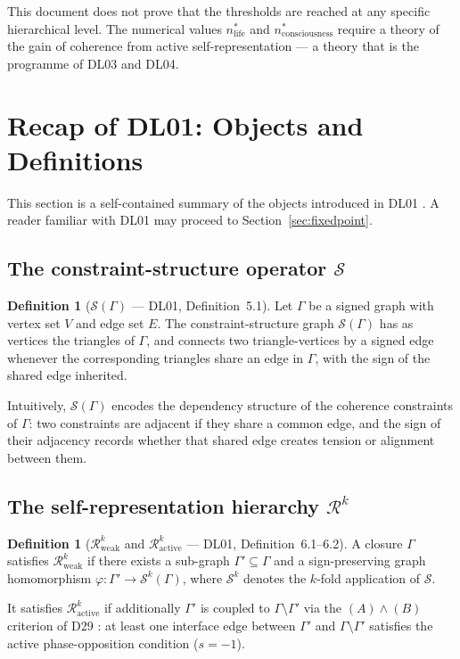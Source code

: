\documentclass[12pt,a4paper]{article}
\theoremstyle{plain}
\theoremstyle{definition}
\newtheorem{definition}[theorem]{Definition}
\theoremstyle{remark}
\newcommand{\Sop}{\mathcal{S}}
\newcommand{\Rop}{\mathcal{R}}
\newcommand{\nlife}{n^{*}_{\mathrm{life}}}
\newcommand{\ncons}{n^{*}_{\mathrm{consciousness}}}
\begin{document}
This document does not prove that the thresholds are reached at any specific
hierarchical level. The numerical values $\nlife$ and $\ncons$ require a theory of
the gain of coherence from active self-representation --- a theory that is the
programme of DL03 and DL04.

\section{Recap of DL01: Objects and Definitions}
\label{sec:recap}

This section is a self-contained summary of the objects introduced in DL01
\cite{DL01}. A reader familiar with DL01 may proceed to Section~\ref{sec:fixedpoint}.

\subsection{The constraint-structure operator \texorpdfstring{$\Sop$}{S}}

\begin{definition}[$\Sop(\Gamma)$ --- DL01, Definition~5.1]
Let $\Gamma$ be a signed graph with vertex set $V$ and edge set $E$. The
constraint-structure graph $\Sop(\Gamma)$ has as vertices the triangles of $\Gamma$,
and connects two triangle-vertices by a signed edge whenever the corresponding
triangles share an edge in $\Gamma$, with the sign of the shared edge inherited.
\end{definition}

Intuitively, $\Sop(\Gamma)$ encodes the dependency structure of the coherence
constraints of $\Gamma$: two constraints are adjacent if they share a common edge,
and the sign of their adjacency records whether that shared edge creates tension or
alignment between them.

\subsection{The self-representation hierarchy \texorpdfstring{$\Rop^k$}{Rk}}

\begin{definition}[$\Rop^k_{\mathrm{weak}}$ and $\Rop^k_{\mathrm{active}}$ --- DL01, Definition~6.1--6.2]
A closure $\Gamma$ satisfies $\Rop^k_{\mathrm{weak}}$ if there exists a sub-graph
$\Gamma' \subseteq \Gamma$ and a sign-preserving graph homomorphism $\varphi: \Gamma'
\to \Sop^k(\Gamma)$, where $\Sop^k$ denotes the $k$-fold application of $\Sop$.

It satisfies $\Rop^k_{\mathrm{active}}$ if additionally $\Gamma'$ is coupled to
$\Gamma \setminus \Gamma'$ via the $(A)\wedge(B)$ criterion of D29 \cite{D29}: at
least one interface edge between $\Gamma'$ and $\Gamma \setminus \Gamma'$ satisfies
the active phase-opposition condition ($s = -1$).
\end{definition}
\end{document}
